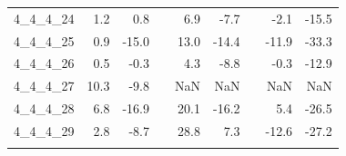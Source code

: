 \begin{longtable}{lrrcrrcrr}
4\_4\_4\_24      &                 1.2 &                   0.8 &&                  6.9 &                   -7.7 &&                 -2.1 &                  -15.5 \\
4\_4\_4\_25      &                 0.9 &                 -15.0 &&                 13.0 &                  -14.4 &&                -11.9 &                  -33.3 \\
4\_4\_4\_26      &                 0.5 &                  -0.3 &&                  4.3 &                   -8.8 &&                 -0.3 &                  -12.9 \\
4\_4\_4\_27      &                10.3 &                  -9.8 &&                  NaN &                    NaN &&                  NaN &                    NaN \\
4\_4\_4\_28      &                 6.8 &                 -16.9 &&                 20.1 &                  -16.2 &&                  5.4 &                  -26.5 \\
4\_4\_4\_29      &                 2.8 &                  -8.7 &&                 28.8 &                    7.3 &&                -12.6 &                  -27.2 \\
\bottomrule
\label{tab:relative}
\end{longtable}




